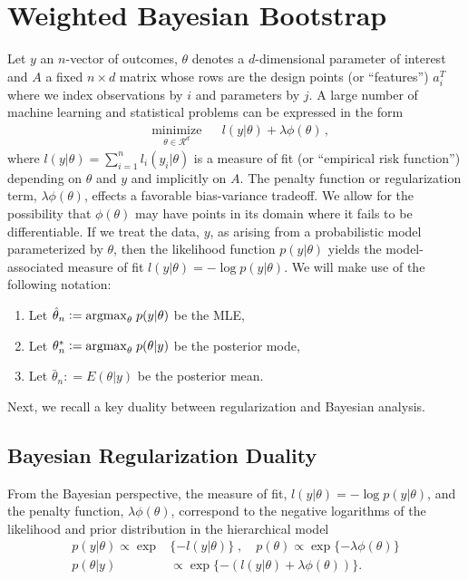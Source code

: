 \documentclass[12pt]{TD-CJS}
\newcommand{\R}{\mathcal{R}}
\newcommand{\defeq}{\mathrel{\mathop:}=}
\begin{document}
\section{Weighted Bayesian Bootstrap}
Let  $y$ an $n$-vector of outcomes, $\theta$ denotes a $d$-dimensional parameter of interest and $A$ a fixed $n \times d$ matrix whose rows are the design points (or ``features'') $a_i^T$
where we index  observations by $i$ and parameters by $j$.  
A large number of machine learning and statistical problems can be expressed in the form
\begin{equation}
\label{eqn:canonicalform}
\begin{aligned}
& \underset{\theta \in \R^d}{\text{minimize}}
& &  l(y| \theta) + \lambda\phi(\theta) \, ,
\end{aligned}
\end{equation}
where $l(y| \theta) = \sum_{i=1}^n l_i( y_i | \theta )$ is a measure of fit (or ``empirical risk function'') depending on $\theta$ and $y$ and implicitly on $A$.
The penalty function or regularization term, $\lambda\phi(\theta) $,  
effects a favorable bias-variance tradeoff.  We allow for the possibility that $\phi(\theta)$ may have points in its domain where it fails to be differentiable.  
If we treat the data, $y$, as arising from a probabilistic 
model parameterized by $\theta$, then the likelihood function $p(y|\theta)$ yields 
the model-associated measure of fit $l(y| \theta) = -\log p(y|\theta)$.
We will make use of the following notation:
\begin{enumerate}[label=(\roman*)]
\item Let $ \hat{\theta}_n \defeq {\rm arg max}_\theta\; p(y |\theta) $ be the MLE, 
\item Let $\theta^*_n \defeq {\rm arg max}_\theta \; p( \theta|y) $ be the posterior mode,
\item Let $ \bar{\theta}_n \defeq E(\theta | y) $ be the posterior mean.
\end{enumerate}
Next, we recall a key duality between regularization and Bayesian analysis.

\subsection{Bayesian Regularization Duality}

From the Bayesian perspective, the measure of fit, $l(y|\theta) = - \log p(y| \theta)$, and the penalty function, $\lambda\phi(\theta)$, correspond to the negative logarithms of the likelihood and prior distribution in the hierarchical model
\begin{align*}
 p(y | \theta) \propto \exp & \{-  l(y|\theta)\} \; , \quad p(\theta) \propto \exp\{ - \lambda\phi(\theta) \} \\
p( \theta | y ) &  \propto \exp\{- ( l(y|\theta) + \lambda\phi(\theta) ) \}.
\end{align*}
\end{document}
